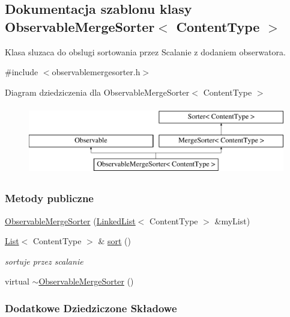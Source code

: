 \hypertarget{class_observable_merge_sorter}{\subsection{Dokumentacja szablonu klasy Observable\-Merge\-Sorter$<$ Content\-Type $>$}
\label{class_observable_merge_sorter}
}


Klasa sluzaca do obslugi sortowania przez Scalanie z dodaniem obserwatora.  




{\ttfamily \#include $<$observablemergesorter.\-h$>$}

Diagram dziedziczenia dla Observable\-Merge\-Sorter$<$ Content\-Type $>$\begin{figure}[H]
\begin{center}
\leavevmode
\includegraphics[height=3.000000cm]{class_observable_merge_sorter}
\end{center}
\end{figure}
\subsubsection*{Metody publiczne}
\begin{DoxyCompactItemize}
\item 
\hyperlink{class_observable_merge_sorter_a90295ee0129f37bfa31922ead65b406a}{Observable\-Merge\-Sorter} (\hyperlink{class_linked_list}{Linked\-List}$<$ Content\-Type $>$ \&my\-List)
\item 
\hyperlink{class_list}{List}$<$ Content\-Type $>$ \& \hyperlink{class_observable_merge_sorter_adc1960b58289c829ca9c77b7b6bc306f}{sort} ()
\begin{DoxyCompactList}\small\item\em sortuje przez scalanie \end{DoxyCompactList}\item 
virtual \hyperlink{class_observable_merge_sorter_a277a49a0c115b1e9900d1d3e7be0be6f}{$\sim$\-Observable\-Merge\-Sorter} ()
\end{DoxyCompactItemize}
\subsubsection*{Dodatkowe Dziedziczone Składowe}


